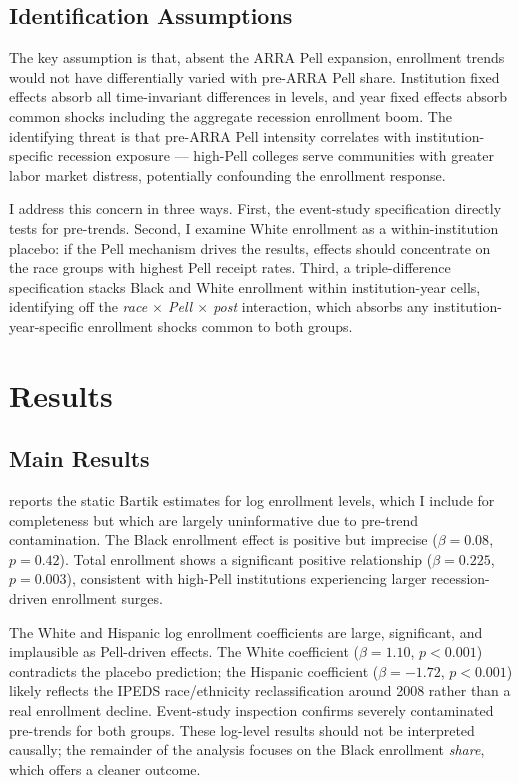 \documentclass[12pt]{article}
\begin{document}
\subsection{Identification Assumptions}

The key assumption is that, absent the ARRA Pell expansion, enrollment trends would not have differentially varied with pre-ARRA Pell share. Institution fixed effects absorb all time-invariant differences in levels, and year fixed effects absorb common shocks including the aggregate recession enrollment boom. The identifying threat is that pre-ARRA Pell intensity correlates with institution-specific recession exposure --- high-Pell colleges serve communities with greater labor market distress, potentially confounding the enrollment response.

I address this concern in three ways. First, the event-study specification directly tests for pre-trends. Second, I examine White enrollment as a within-institution placebo: if the Pell mechanism drives the results, effects should concentrate on the race groups with highest Pell receipt rates. Third, a triple-difference specification stacks Black and White enrollment within institution-year cells, identifying off the \textit{race $\times$ Pell $\times$ post} interaction, which absorbs any institution-year-specific enrollment shocks common to both groups.

\section{Results}

\subsection{Main Results}



 reports the static Bartik estimates for log enrollment levels, which I include for completeness but which are largely uninformative due to pre-trend contamination. The Black enrollment effect is positive but imprecise ($\beta = 0.08$, $p = 0.42$). Total enrollment shows a significant positive relationship ($\beta = 0.225$, $p = 0.003$), consistent with high-Pell institutions experiencing larger recession-driven enrollment surges.

The White and Hispanic log enrollment coefficients are large, significant, and implausible as Pell-driven effects. The White coefficient ($\beta = 1.10$, $p < 0.001$) contradicts the placebo prediction; the Hispanic coefficient ($\beta = -1.72$, $p < 0.001$) likely reflects the IPEDS race/ethnicity reclassification around 2008 rather than a real enrollment decline. Event-study inspection confirms severely contaminated pre-trends for both groups. These log-level results should not be interpreted causally; the remainder of the analysis focuses on the Black enrollment \textit{share}, which offers a cleaner outcome.
\end{document}
